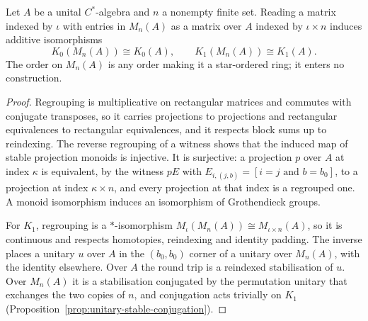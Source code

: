 \begin{proposition}\label{prop:operator-k-matrix-stability}
\leanok
Let $A$ be a unital $C^*$-algebra and $n$ a nonempty finite set. Reading a
matrix indexed by $\iota$ with entries in $M_n(A)$ as a matrix over $A$ indexed
by $\iota\times n$ induces additive isomorphisms
\[
 K_0(M_n(A))\cong K_0(A),\qquad K_1(M_n(A))\cong K_1(A).
\]
The order on $M_n(A)$ is any order making it a star-ordered ring; it enters no
construction.
\end{proposition}
\begin{proof}
\leanok
Regrouping is multiplicative on rectangular matrices and commutes with
conjugate transposes, so it carries projections to projections and rectangular
equivalences to rectangular equivalences, and it respects block sums up to
reindexing. The reverse regrouping of a witness shows that the induced map of
stable projection monoids is injective. It is surjective: a projection $p$ over
$A$ at index $\kappa$ is equivalent, by the witness $pE$ with
$E_{i,(j,b)}=[i=j\text{ and }b=b_0]$, to a projection at index $\kappa\times n$,
and every projection at that index is a regrouped one. A monoid isomorphism
induces an isomorphism of Grothendieck groups.

For $K_1$, regrouping is a $*$-isomorphism
$M_\iota(M_n(A))\cong M_{\iota\times n}(A)$, so it is continuous and respects
homotopies, reindexing and identity padding. The inverse places a unitary $u$
over $A$ in the $(b_0,b_0)$ corner of a unitary over $M_n(A)$, with the identity
elsewhere. Over $A$ the round trip is a reindexed stabilisation of $u$. Over
$M_n(A)$ it is a stabilisation conjugated by the permutation unitary that
exchanges the two copies of $n$, and conjugation acts trivially on $K_1$
(Proposition~\ref{prop:unitary-stable-conjugation}).
\end{proof}

